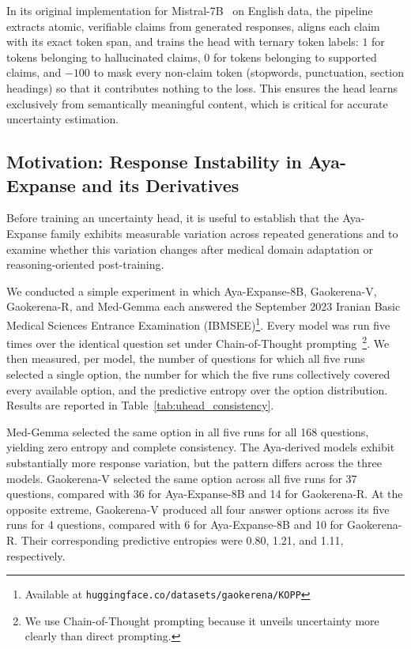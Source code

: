 \documentclass[review]{elsarticle}
\begin{document}
In its original implementation for Mistral-7B~\cite{b34} on English data, the pipeline extracts atomic, verifiable claims from generated responses, aligns each claim with its exact token span, and trains the head with ternary token labels: $1$ for tokens belonging to hallucinated claims, $0$ for tokens belonging to supported claims, and $-100$ to mask every non-claim token (stopwords, punctuation, section headings) so that it contributes nothing to the loss. This ensures the head learns exclusively from semantically meaningful content, which is critical for accurate uncertainty estimation.

\subsection{Motivation: Response Instability in Aya-Expanse and its Derivatives}

Before training an uncertainty head, it is useful to establish that the Aya-Expanse family exhibits measurable variation across repeated generations and to examine whether this variation changes after medical domain adaptation or reasoning-oriented post-training.

We conducted a simple experiment in which Aya-Expanse-8B, Gaokerena-V, Gaokerena-R, and Med-Gemma each answered the September 2023 Iranian Basic Medical Sciences Entrance Examination (IBMSEE)\footnote{Available at \texttt{huggingface.co/datasets/gaokerena/KOPP}}. Every model was run five times over the identical question set under Chain-of-Thought prompting~\cite{b7}\footnote{We use Chain-of-Thought prompting because it unveils uncertainty more clearly than direct prompting.}. We then measured, per model, the number of questions for which all five runs selected a single option, the number for which the five runs collectively covered every available option, and the predictive entropy over the option distribution. Results are reported in Table~\ref{tab:uhead_consistency}.

Med-Gemma selected the same option in all five runs for all 168 questions, yielding zero entropy and complete consistency. The Aya-derived models exhibit substantially more response variation, but the pattern differs across the three models. Gaokerena-V selected the same option across all five runs for 37 questions, compared with 36 for Aya-Expanse-8B and 14 for Gaokerena-R. At the opposite extreme, Gaokerena-V produced all four answer options across its five runs for 4 questions, compared with 6 for Aya-Expanse-8B and 10 for Gaokerena-R. Their corresponding predictive entropies were 0.80, 1.21, and 1.11, respectively.
\end{document}
